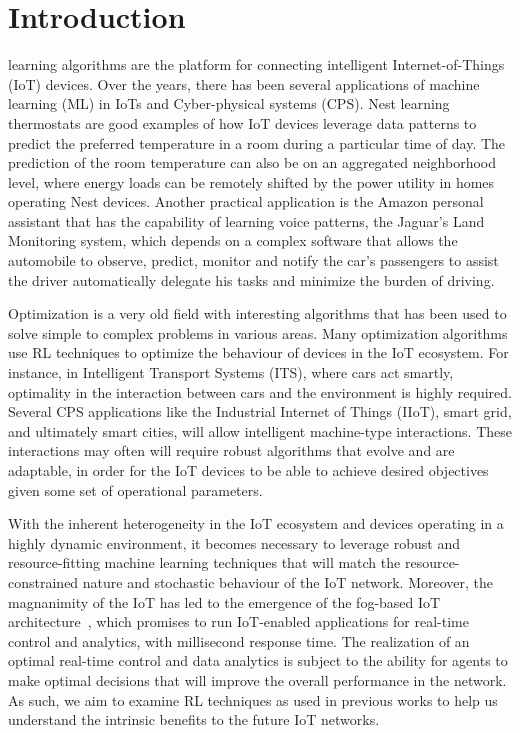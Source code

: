 \documentclass[journal]{IEEEtran}
\begin{document}
%
\IEEEpeerreviewmaketitle

\section{Introduction}
\label{sec:Introduction}
 learning algorithms are the platform for connecting intelligent Internet-of-Things (IoT) devices. Over the years, there has been several applications of machine learning (ML) in IoTs and Cyber-physical systems (CPS). Nest learning thermostats are good examples of how IoT devices leverage data patterns to predict the preferred temperature in a room during a particular time of day. The prediction of the room temperature can also be on an aggregated neighborhood level, where energy loads can be remotely shifted by the power utility in homes operating Nest devices. Another practical application is the Amazon personal assistant that has the capability of learning voice patterns, the Jaguar's Land Monitoring system, which depends on a complex software that allows the automobile to observe, predict, monitor and notify the car's passengers to assist the driver automatically delegate his tasks and minimize the burden of driving.

Optimization is a very old field with interesting algorithms that has been used to solve simple to complex problems in various areas. Many optimization algorithms use RL techniques to optimize the behaviour of devices in the IoT ecosystem. For instance, in Intelligent Transport Systems (ITS), where cars act smartly, optimality in the interaction between cars and the environment is highly required. Several CPS applications like the Industrial Internet of Things (IIoT), smart grid, and ultimately smart cities, will allow intelligent machine-type interactions. These interactions may often will require robust algorithms that evolve and are adaptable, in order for the IoT devices to be able to achieve desired objectives given some set of operational parameters.

With the inherent heterogeneity in the IoT ecosystem and devices operating in a highly dynamic environment, it becomes necessary to leverage robust and resource-fitting machine learning techniques that will match the resource-constrained nature and stochastic behaviour of the IoT network. Moreover, the magnanimity of the IoT has led to the emergence of the fog-based IoT architecture~\cite{Omoniwa2018}, which promises to run IoT-enabled applications for real-time control and analytics, with millisecond response time. The realization of an optimal real-time control and data analytics is subject to the ability for agents to make optimal decisions that will improve the overall performance in the network. As such, we aim to examine RL techniques as used in previous works to help us understand the intrinsic benefits to the future IoT networks.
\end{document}
